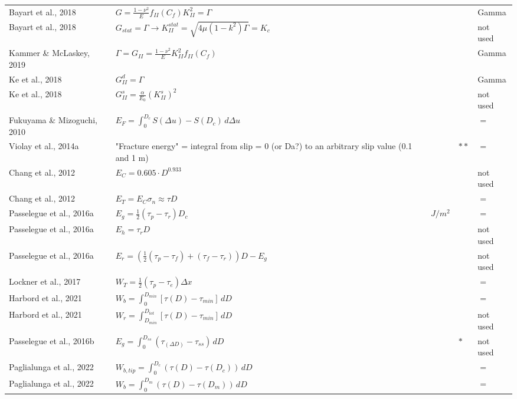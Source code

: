 \documentclass[12pt]{article}
\begin{document}
\begin{longtable}{|p{3.5 cm}|p{6.5 cm}|p{1.25 cm}|p{1.25 cm}|p{1.5 cm}|}
Bayart et al., 2018 & \( \displaystyle G = \frac{1-\nu^2}{E} f_{II}(C_f) K_{II}^2 = \Gamma \) & & & Gamma \\
Bayart et al., 2018 & \( \displaystyle G_{stat} = \Gamma \rightarrow K_{II}^{stat} = \sqrt{4 \mu (1-k^2) \Gamma} = K_c \) & & & not used \\
Kammer \& McLaskey, 2019 & \( \displaystyle \Gamma = G_{II} = \frac{1-\nu^2}{E} K_{II}^2 f_{II}(C_f)\) & & & Gamma \\
Ke et al., 2018 & \( \displaystyle G_{II}^d = \Gamma \) & & & Gamma \\
Ke et al., 2018 & \( \displaystyle G_{II}^s = \frac{\alpha}{E_0} (K_{II}^s)^2 \) & & & not used \\
Fukuyama \& Mizoguchi, 2010 & \( \displaystyle E_F = \int_{0}^{D_c} S(\Delta u) - S(D_c) \,d \Delta u \) & & & $=$ \\
Violay et al., 2014a & "Fracture energy" = integral from slip = 0 (or Da?) to an arbitrary slip value (0.1 and 1 m) & & $**$ & $=$ \\
Chang et al., 2012 & \( \displaystyle E_C = 0.605 \cdot D^{0.933} \) & & & not used \\
Chang et al., 2012 & \( \displaystyle E_T = E_C \sigma_n \approx \tau D\) & & & $=$ \\
Passelegue et al., 2016a & \( \displaystyle E_g = \frac{1}{2} (\tau_p - \tau_r) D_c \) & $J/m^2$ & & $=$ \\
Passelegue et al., 2016a & \( \displaystyle E_h = \tau_r D \) & & & not used \\
Passelegue et al., 2016a & \( \displaystyle E_r = \left ( \frac{1}{2} (\tau_p - \tau_f) + (\tau_f - \tau_r) \right ) D - E_g  \) & & & not used \\
Lockner et al., 2017 & \( \displaystyle W_T = \frac{1}{2} (\tau_p - \tau_e) \Delta x \) & & & $=$ \\
Harbord et al., 2021 & \( \displaystyle W_b = \int_{0}^{D_{min}} [\tau(D) - \tau_{min}] \,d D \) & & & $=$ \\
Harbord et al., 2021 & \( \displaystyle W_r = \int_{D_{min}}^{D_{tot}} [\tau(D) - \tau_{min}] \,d D \) & & & not used \\
Passelegue et al., 2016b & \( \displaystyle E_g = \int_{0}^{D_{ss}} (\tau_{(\Delta D)} - \tau_{ss}) \,d D \) & & $*$ & not used \\
Paglialunga et al., 2022 & \( \displaystyle W_{b,tip} = \int_{0}^{D_c} (\tau(D)-\tau(D_c)) \,d D \) & & & $=$ \\
Paglialunga et al., 2022 & \( \displaystyle W_b = \int_{0}^{D_m} (\tau(D)-\tau(D_m)) \,d D \) & & & $=$ \\

\end{longtable}
\end{document}
